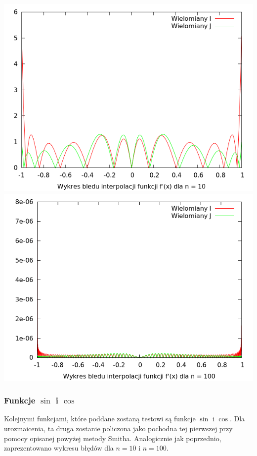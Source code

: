 \documentclass[11pt,leqno]{article}
\begin{document}
\begin{center}
\includegraphics[scale=0.65,natwidth=640,natheight=480]{plot/runge10de.png}\\
\includegraphics[scale=0.65,natwidth=640,natheight=480]{plot/runge100de.png}\\
\end{center}


\subsubsection{Funkcje $\sin$ i $\cos$}
Kolejnymi funkcjami, które poddane zostaną testowi są funkcje $\sin$ i $\cos$. Dla urozmaicenia, ta druga zostanie policzona jako pochodna tej pierwszej przy pomocy opisanej powyżej metody Smitha. Analogicznie jak poprzednio, zaprezentowano wykresu błędów dla $n = 10$ i $n = 100$.
\end{document}
